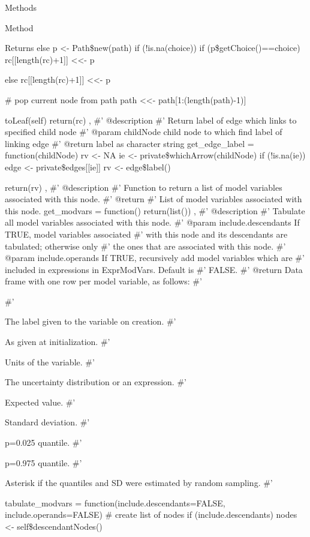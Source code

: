 \documentclass[a4paper]{book}
\begin{document}
\begin{Section}{Methods}
\begin{SubSection}{Method }
\begin{SubSubSection}{Returns}
else 
p <- Path\$new(path)
if (!is.na(choice)) 
if (p\$getChoice()==choice) 
rc[[length(rc)+1]] <<- p


else 
rc[[length(rc)+1]] <<- p


\# pop current node from path
path <<- path[1:(length(path)-1)]

toLeaf(self)
return(rc)
,
\#' @description 
\#' Return label of edge which links to specified child node
\#' @param childNode child node to which find label of linking edge
\#' @return label as character string
get\_edge\_label = function(childNode) 
rv <- NA
ie <- private\$whichArrow(childNode)
if (!is.na(ie))
edge <- private\$edges[[ie]]
rv <- edge\$label()

return(rv)
,
\#' @description 
\#' Function to return a list of model variables associated with this node.
\#' @return 
\#' List of model variables associated with this node.
get\_modvars = function() 
return(list())
,
\#' @description
\#' Tabulate all model variables associated with this node.
\#' @param include.descendants If TRUE, model variables associated
\#' with this node and its descendants are tabulated; otherwise only
\#' the ones that are associated with this node.
\#' @param include.operands If TRUE, recursively add model variables which are
\#' included in expressions in ExprModVars. Default is
\#' FALSE.
\#' @return Data frame with one row per model variable, as follows:
\#' \begin{description}

\#' \item[Label] The label given to the variable on creation.
\#' \item[Description] As given at initialization.
\#' \item[Units] Units of the variable.
\#' \item[Distribution] The uncertainty distribution or an expression.
\#' \item[Mean] Expected value.
\#' \item[SD] Standard deviation.
\#' \item[Q2.5] p=0.025 quantile.
\#' \item[Q97.5] p=0.975 quantile.
\#' \item[Qhat] Asterisk if the quantiles and SD were estimated by random sampling.
\#' 
\end{description}

tabulate\_modvars = function(include.descendants=FALSE, 
include.operands=FALSE) 
\# create list of nodes
if (include.descendants) 
nodes <- self\$descendantNodes()
 

\end{SubSubSection}
\end{SubSection}
\end{Section}
\end{document}
